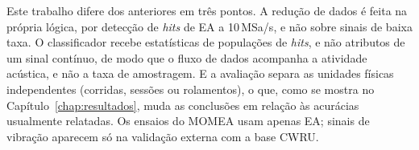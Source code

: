 Este trabalho difere dos anteriores em três pontos. A redução de dados é feita na própria lógica, por detecção de \textit{hits} de EA a 10\,MSa/s, e não sobre sinais de baixa taxa. O classificador recebe estatísticas de populações de \textit{hits}, e não atributos de um sinal contínuo, de modo que o fluxo de dados acompanha a atividade acústica, e não a taxa de amostragem. E a avaliação separa as unidades físicas independentes (corridas, sessões ou rolamentos), o que, como se mostra no Capítulo~\ref{chap:resultados}, muda as conclusões em relação às acurácias usualmente relatadas. Os ensaios do MOMEA usam apenas EA; sinais de vibração aparecem só na validação externa com a base CWRU.
